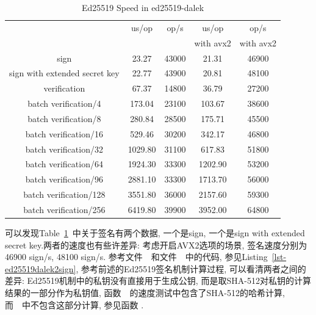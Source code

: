 \begin{table}[h]
\centering
\caption{Ed25519 Speed in ed25519-dalek}\label{tbl-ed25519-dalek}
\begin{tabular}{|c|c|c|c|c|}
\hline
                                    &       us/op   &  op/s      &     us/op        & op/s \\ 
                             	  &                  &               &   with avx2 & with avx2 \\\hline
sign				  &  23.27 & 43000 & 21.31 & 46900\\\hline
sign with extended secret key &  22.77 & 43900 & 20.81 & 48100\\ \hline
verification                  & 67.37 & 14800 & 36.79 & 27200\\ \hline
batch verification/4     & 173.04 & 23100 & 103.67 & 38600\\\hline
batch verification/8     & 280.84 & 28500 & 175.71 & 45500\\\hline
batch verification/16   & 529.46 & 30200 & 342.17 & 46800\\\hline
batch verification/32   & 1029.80 & 31100 & 617.83 & 51800\\\hline
batch verification/64   & 1924.30 & 33300 & 1202.90 & 53200\\\hline
batch verification/96   & 2881.10 & 33300 & 1713.70 & 56000\\\hline
batch verification/128 & 3551.80 & 36000 & 2157.60 & 59300\\\hline
batch verification/256 & 6419.80 & 39900 & 3952.00 & 64800\\\hline

\end{tabular}
\end{table}

可以发现Table~\ref{tbl-ed25519-dalek}~中关于签名有两个数据, 一个是sign, 
一个是sign with extended secret key.两者的速度也有些许差异:
考虑开启AVX2选项的场景, 签名速度分别为46900 sign/s, 48100 sign/s.
参考文件~~和文件~~中的代码,
参见Listing~\ref{lst-ed25519dalek2sign}, 参考前述的Ed25519签名机制计算过程,
可以看清两者之间的差异: Ed25519机制中的私钥没有直接用于生成公钥,
而是取\textsf{SHA-512}对私钥的计算结果的一部分作为私钥值, 
函数~~的速度测试中包含了\textsf{SHA-512}的哈希计算,
而~~中不包含这部分计算, 参见函数
.

